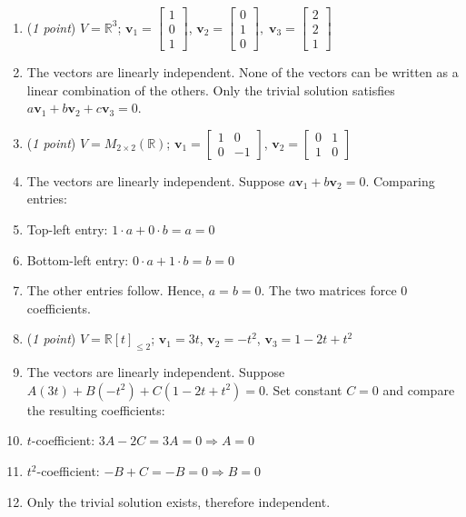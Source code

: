 \documentclass[11pt]{article}
\theoremstyle{definition}
\numberwithin{equation}{subsection}
\begin{document}
\begin{enumerate}
\begin{enumerate}
\item[(b)] (\emph{1 point}) $V=\mathbb{R}^3$;\; $\mathbf{v}_1=\begin{bmatrix} 1\\ 0\\ 1\end{bmatrix}$,\; $\mathbf{v}_2=\begin{bmatrix} 0\\ 1\\ 0\end{bmatrix},\; \mathbf{v}_3=\begin{bmatrix} 2\\ 2\\ 1\end{bmatrix}$
\item[] The vectors are linearly independent. None of the vectors can be written as a linear combination of the others. Only the trivial solution satisfies $a\mathbf{v}_1+b\mathbf{v}_2+c\mathbf{v}_3=0.$

\item[(c)] (\emph{1 point}) $V=M_{2\times 2}(\mathbb{R})$;\; $\mathbf{v}_1=\begin{bmatrix} 1 & 0\\ 0 & -1\end{bmatrix}$,\; $\mathbf{v}_2=\begin{bmatrix} 0 & 1\\ 1 & 0\end{bmatrix}$
\item[] The vectors are linearly independent. Suppose $a\mathbf{v}_1+b\mathbf{v}_2=0$. Comparing entries:
\item[] Top-left entry: $1\cdot a+ 0\cdot b=a=0$
\item[] Bottom-left entry: $0\cdot a+1\cdot b=b=0$
\item[] The other entries follow. Hence, $a=b=0$. The two matrices force 0 coefficients.

\item[(d)] (\emph{1 point}) $V=\mathbb{R}[t]_{\leq 2}$;\; $\mathbf{v}_1=3t$,\; $\mathbf{v}_2=-t^2$,\; $\mathbf{v}_3=1-2t+t^2$
\item[] The vectors are linearly independent. Suppose $A(3t)+B(-t^2)+C(1-2t+t^2)=0$. Set constant $C=0$ and compare the resulting coefficients:
\item[] $t$-coefficient: $3A-2C=3A=0 \Rightarrow A=0$
\item[] $t^2$-coefficient: $-B+C=-B=0 \Rightarrow B=0$
\item[] Only the trivial solution exists, therefore independent.
\end{enumerate}


\end{enumerate}
\end{document}
